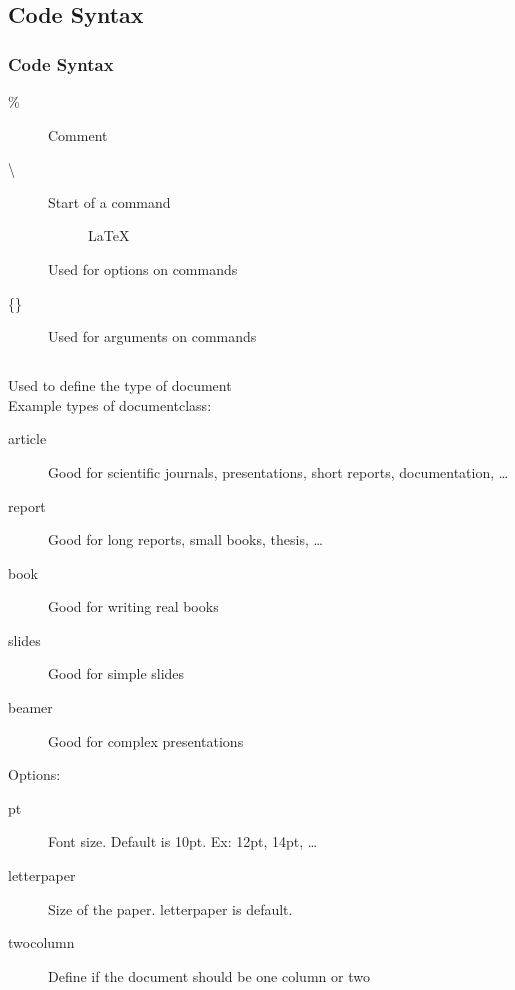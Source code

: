 
\subsection{Code Syntax}

\begin{frame}[fragile]
\frametitle{Code Syntax}
    \begin{description}
        \item[\%] Comment
        \item[\textbackslash] Start of a command
        \begin{description}
            \item[] \LaTeX
        \end{description}
        \item[\brackets{}] Used for options on commands
        \item[\{\}] Used for arguments on commands
    \end{description}
\end{frame}




\subsection{}

\begin{frame}[allowframebreaks=0.8,fagile]
\frametitle{}
    Used to define the type of document\\
    Example types of documentclass:
    \begin{description}
        \item[article] Good for scientific journals, presentations, short reports, documentation, \ldots
        \item[report] Good for long reports, small books, thesis, \ldots
        \item[book] Good for writing real books
        \item[slides] Good for simple slides
        \item[beamer] Good for complex presentations
    \end{description}
    \framebreak
    Options:
    \begin{description}
        \item[pt] Font size. Default is 10pt. Ex: 12pt, 14pt, \ldots
        \item[letterpaper] Size of the paper. letterpaper is default.
        \item[twocolumn] Define if the document should be one column or two
    \end{description}
\end{frame}




